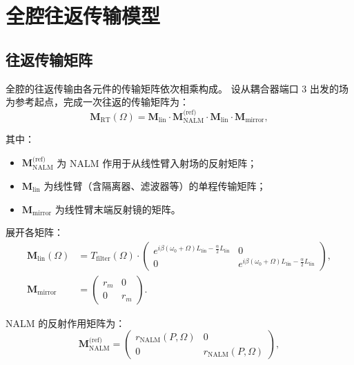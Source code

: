 \documentclass[11pt,a4paper]{ctexart}
\begin{document}
\section{全腔往返传输模型}
\label{sec:roundtrip}

\subsection{往返传输矩阵}

全腔的往返传输由各元件的传输矩阵依次相乘构成。
设从耦合器端口 3 出发的场为参考起点，完成一次往返的传输矩阵为：
\begin{equation}
  \mathbf{M}_{\text{RT}}(\Omega) = \mathbf{M}_{\text{lin}} \cdot
  \mathbf{M}_{\text{NALM}}^{\text{(ref)}} \cdot
  \mathbf{M}_{\text{lin}} \cdot
  \mathbf{M}_{\text{mirror}},
  \label{eq:M_RT}
\end{equation}

其中：
\begin{itemize}
  \item $\mathbf{M}_{\text{NALM}}^{\text{(ref)}}$ 为 NALM 作用于从线性臂入射场的反射矩阵；
  \item $\mathbf{M}_{\text{lin}}$ 为线性臂（含隔离器、滤波器等）的单程传输矩阵；
  \item $\mathbf{M}_{\text{mirror}}$ 为线性臂末端反射镜的矩阵。
\end{itemize}

展开各矩阵：
\begin{align}
  \mathbf{M}_{\text{lin}}(\Omega) &=
  T_{\text{filter}}(\Omega) \cdot
  \begin{pmatrix}
    e^{i\beta(\omega_0+\Omega)L_{\text{lin}} - \frac{\alpha}{2}L_{\text{lin}}} & 0 \\[4pt]
    0 & e^{i\beta(\omega_0+\Omega)L_{\text{lin}} - \frac{\alpha}{2}L_{\text{lin}}}
  \end{pmatrix}, \\[4pt]
  \mathbf{M}_{\text{mirror}} &=
  \begin{pmatrix} r_m & 0 \\ 0 & r_m \end{pmatrix}.
\end{align}

NALM 的反射作用矩阵为：
\begin{equation}
  \mathbf{M}_{\text{NALM}}^{\text{(ref)}} =
  \begin{pmatrix}
    r_{\text{NALM}}(P, \Omega) & 0 \\[2pt]
    0 & r_{\text{NALM}}(P, \Omega)
  \end{pmatrix},
  \label{eq:M_NALM_ref}
\end{equation}
\end{document}
